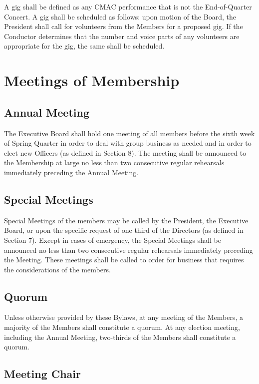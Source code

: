 \documentclass{article}
\begin{document}
A gig shall be defined as any CMAC performance that is not the End-of-Quarter
Concert. A gig shall be scheduled as follows: upon motion of the Board, the
President shall call for volunteers from the Members for a proposed gig. If the
Conductor determines that the number and voice parts of any volunteers are
appropriate for the gig, the same shall be scheduled.

\section{Meetings of Membership}

\subsection{Annual Meeting}

The Executive Board shall hold one meeting of all members before the
sixth week of Spring Quarter in order to deal with group business
as needed and in order to elect new Officers (as defined in Section
8). The meeting shall be announced to the Membership at large no less
than two consecutive regular rehearsals immediately preceding the
Annual Meeting.

\subsection{Special Meetings}

Special Meetings of the members may be called by the President, the
Executive Board, or upon the specific request of one third of the
Directors (as defined in Section 7). Except in cases of emergency, the Special Meetings shall be announced no less
than two consecutive regular rehearsals immediately preceding the
Meeting. These meetings shall be called to order for business that requires the considerations of the members.

\subsection{Quorum}

Unless otherwise provided by these Bylaws, at any meeting of the Members,
a majority of the Members shall constitute a quorum. At any election
meeting, including the Annual Meeting, two-thirds of the Members shall
constitute a quorum.

\subsection{Meeting Chair}
\end{document}
